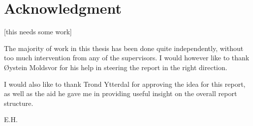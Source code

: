 \section*{Acknowledgment}




[this needs some work]

The majority of work in this thesis has been done quite independently, without too much intervention from any of the supervisors. I would however like to thank Øystein Moldsvor for his help in steering the report in the right direction.

I would also like to thank Trond Ytterdal for approving the idea for this report, as well as the aid he gave me in providing useful insight on the overall report structure. 

\begin{flushright}
E.H.\\[1pc]
\end{flushright}